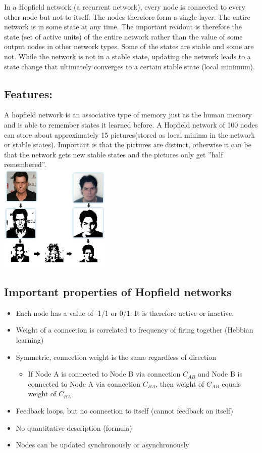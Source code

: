\documentclass[english,11pt]{article}
\begin{document}
In a Hopfield network (a recurrent network), every node is connected to every other node but not to itself.
The nodes therefore form a single layer. The entire network is in some state at any time. The important readout is therefore the state (set of active units) of the entire network rather than the value of some output nodes in other network types.
Some of the states are stable and some are not. While the network is not in a stable state, updating the network leads to a state change that ultimately converges to a certain stable state (local minimum).\\
\subsection*{Features:}
A hopfield network is an associative type of memory just as the human memory and is able to remember states it learned before. A Hopfield network of 100 nodes can store about approximately 15 pictures(stored as local minima in the network or stable states). Important is that the pictures are distinct, otherwise it can be that the network gets new stable states and the pictures only get ''half remembered''.\\
\includegraphics[width=0.4\textwidth]{hopfield-network-face-recog.png}


\subsection*{Important properties of Hopfield networks}
\begin{itemize}
\item Each node has a value of -1/1 or 0/1. It is therefore active or inactive.
\item Weight of  a conncetion is correlated to frequency of firing together (Hebbian learning)
\item Symmetric, conncetion weight is the same regardless of direction
\subitem \begin{itemize} \item If Node A is connected to Node B via conncetion $C_{AB}$ and Node B is connected to Node A via conncetion $C_{BA}$, then weight of $C_{AB}$ equals weight of $C_{BA}$ \end{itemize}
\item Feedback loops, but no conncetion to itself (cannot feedback on itself)
\item No quantitative description (formula)
\item Nodes can be updated synchronously or asynchronously
\end{itemize}
\end{document}
